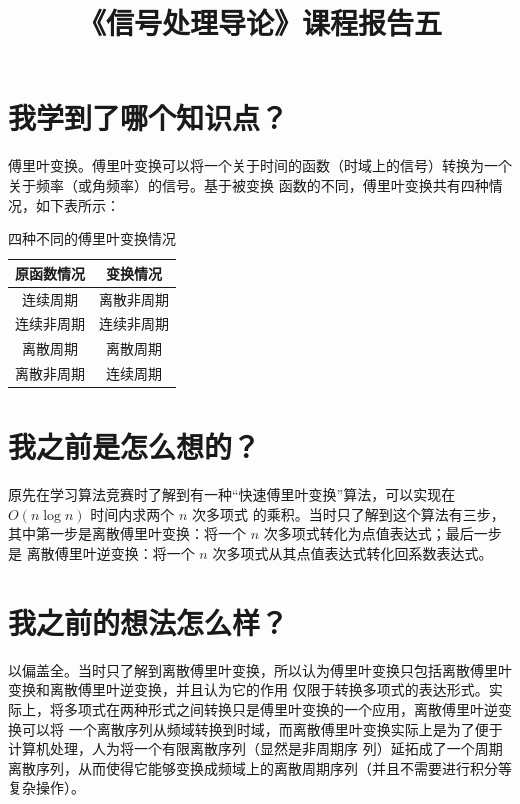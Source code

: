 \documentclass{ctexart}
\title{《信号处理导论》课程报告五}
\begin{document}
    \maketitle

    \section{我学到了哪个知识点？}

    傅里叶变换。傅里叶变换可以将一个关于时间的函数（时域上的信号）转换为一个关于频率（或角频率）的信号。基于被变换
    函数的不同，傅里叶变换共有四种情况，如下表所示：

    \begin{table}[h]
        \centering
        \caption{四种不同的傅里叶变换情况}
        \begin{tabular}{|*{2}{c|}}
            \hline
            原函数情况 & 变换情况 \\ \hline
            连续周期 & 离散非周期 \\
            连续非周期 & 连续非周期 \\
            离散周期 & 离散周期 \\
            离散非周期 & 连续周期 \\ \hline
        \end{tabular}
    \end{table}

    \section{我之前是怎么想的？}

    原先在学习算法竞赛时了解到有一种``快速傅里叶变换''算法，可以实现在 $O(n \log n)$ 时间内求两个 $n$ 次多项式
    的乘积。当时只了解到这个算法有三步，其中第一步是离散傅里叶变换：将一个 $n$ 次多项式转化为点值表达式；最后一步是
    离散傅里叶逆变换：将一个 $n$ 次多项式从其点值表达式转化回系数表达式。

    \section{我之前的想法怎么样？}

    以偏盖全。当时只了解到离散傅里叶变换，所以认为傅里叶变换只包括离散傅里叶变换和离散傅里叶逆变换，并且认为它的作用
    仅限于转换多项式的表达形式。实际上，将多项式在两种形式之间转换只是傅里叶变换的一个应用，离散傅里叶逆变换可以将
    一个离散序列从频域转换到时域，而离散傅里叶变换实际上是为了便于计算机处理，人为将一个有限离散序列（显然是非周期序
    列）延拓成了一个周期离散序列，从而使得它能够变换成频域上的离散周期序列（并且不需要进行积分等复杂操作）。
\end{document}
